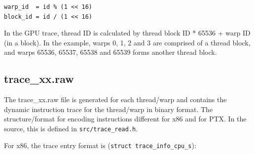 \begin{Verbatim}
warp_id  = id % (1 << 16)
block_id = id / (1 << 16)
\end{Verbatim}

\ignore
		{
		In the GPU trace, thread ID is calculated by thread block ID * 65536 + warp ID (in a block). 
		In the example, warps 0, 1, 2 and 3 are comprised of a thread block, and warps 65536, 65537, 65538
		and 65539 forms another thread block.
		}

\subsection{trace\_xx.raw}

The trace\_xx.raw file is generated for each thread/warp and contains the
dynamic instruction trace for the thread/warp in binary format. The
structure/format for encoding instructions different for x86 and for PTX. In the
source, this is defined in \Verb+src/trace_read.h+.

For x86, the trace entry format is (\Verb+struct trace_info_cpu_s+):

